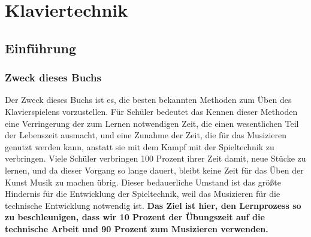 
\part{Klaviertechnik}
\label{c1i1}

\chapter{Einführung} 

\section{Zweck dieses Buchs}

Der Zweck dieses Buchs ist es, die besten bekannten Methoden zum Üben des Klavierspielens vorzustellen.
Für Schüler bedeutet das 
Kennen dieser Methoden eine Verringerung der zum Lernen notwendigen Zeit, die einen wesentlichen Teil der Lebenszeit ausmacht, und eine Zunahme der Zeit, die für das Musizieren genutzt werden kann, anstatt sie mit dem Kampf mit der Spieltechnik zu verbringen.
Viele Schüler verbringen 100 Prozent ihrer Zeit damit, neue Stücke zu lernen, und da dieser Vorgang so lange dauert, bleibt keine Zeit für das Üben der Kunst Musik zu machen übrig.
Dieser bedauerliche Umstand ist das größte Hindernis für die Entwicklung der Spieltechnik, weil das Musizieren für die technische Entwicklung notwendig ist.
\textbf{Das Ziel ist hier, den Lernprozess so zu beschleunigen, dass wir 10 Prozent der Übungszeit auf die technische Arbeit und 90 Prozent zum Musizieren verwenden.}

